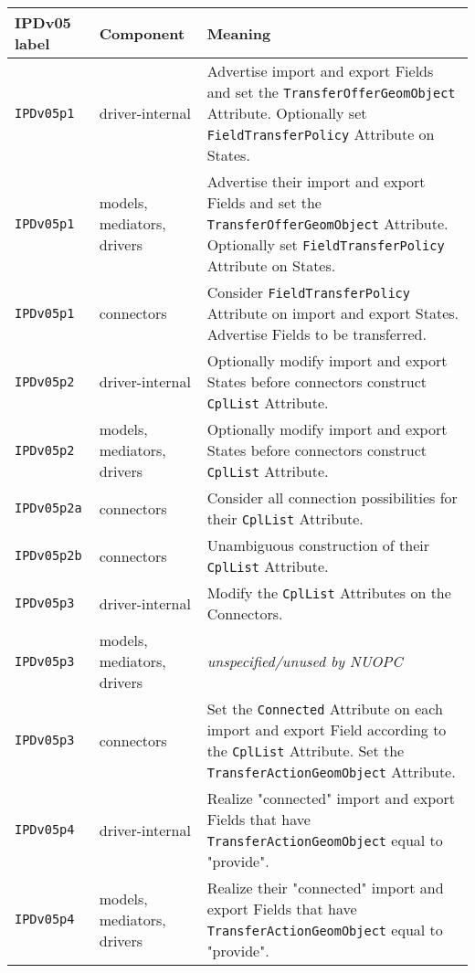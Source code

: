 \vspace*{3ex}
\begin{longtable}[h]{|p{35mm}|p{4cm}|p{6cm}|}
     \hline\hline
     {\bf IPDv05 label} & {\bf Component} & {\bf Meaning}\\
     \hline\hline
     {\tt IPDv05p1}   & driver-internal             & Advertise import and export Fields and set the {\tt TransferOfferGeomObject} Attribute. Optionally set {\tt FieldTransferPolicy} Attribute on States. \\ \hline
     {\tt IPDv05p1}   & models, mediators, drivers  & Advertise their import and export Fields and set the {\tt TransferOfferGeomObject} Attribute. Optionally set {\tt FieldTransferPolicy} Attribute on States. \\ \hline
     {\tt IPDv05p1}   & connectors                  & Consider {\tt FieldTransferPolicy} Attribute on import and export States. Advertise Fields to be transferred. \\ \hline
     {\tt IPDv05p2}   & driver-internal             & Optionally modify import and export States before connectors construct {\tt CplList} Attribute. \\ \hline
     {\tt IPDv05p2}   & models, mediators, drivers  & Optionally modify import and export States before connectors construct {\tt CplList} Attribute. \\ \hline
     {\tt IPDv05p2a}  & connectors                  & Consider all connection possibilities for their {\tt CplList} Attribute.\\ \hline
     {\tt IPDv05p2b}  & connectors                  & Unambiguous construction of their {\tt CplList} Attribute.\\ \hline
     {\tt IPDv05p3}   & driver-internal             & Modify the {\tt CplList} Attributes on the Connectors.\\ \hline
     {\tt IPDv05p3}   & models, mediators, drivers  & {\em unspecified/unused by NUOPC}\\ \hline
     {\tt IPDv05p3}   & connectors                  & Set the {\tt Connected} Attribute on each import and export Field according to the {\tt CplList} Attribute. Set the {\tt TransferActionGeomObject} Attribute.\\ \hline
     {\tt IPDv05p4}   & driver-internal             & Realize "connected" import and export Fields that have {\tt TransferActionGeomObject} equal to "provide".\\ \hline
     {\tt IPDv05p4}   & models, mediators, drivers  & Realize their "connected" import and export Fields that have {\tt TransferActionGeomObject} equal to "provide".\\ \hline

\end{longtable}
